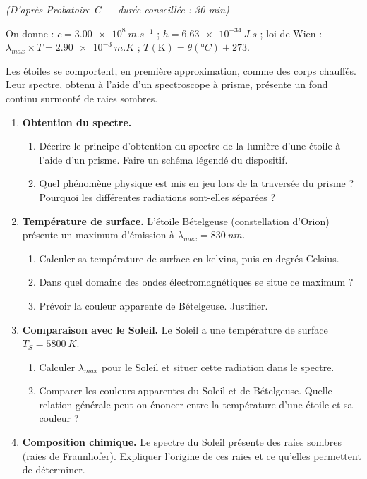 \documentclass[11pt]{article}
\begin{document}
\begin{exercice}
\textit{(D'après Probatoire C — durée conseillée : 30 min)}

On donne : $c = \SI{3,00e8}{m.s^{-1}}$ ; $h = \SI{6,63e-34}{J.s}$ ; loi de Wien : $\lambda_{max} \times T = \SI{2,90e-3}{m.K}$ ; $T(\text{K}) = \theta(°C) + 273$.

Les étoiles se comportent, en première approximation, comme des corps chauffés. Leur spectre, obtenu à l'aide d'un spectroscope à prisme, présente un fond continu surmonté de raies sombres.

\begin{enumerate}
\item \textbf{Obtention du spectre.}
\begin{enumerate}
\item Décrire le principe d'obtention du spectre de la lumière d'une étoile à l'aide d'un prisme. Faire un schéma légendé du dispositif.
\item Quel phénomène physique est mis en jeu lors de la traversée du prisme ? Pourquoi les différentes radiations sont-elles séparées ?
\end{enumerate}
\item \textbf{Température de surface.} L'étoile Bételgeuse (constellation d'Orion) présente un maximum d'émission à $\lambda_{max} = \SI{830}{nm}$.
\begin{enumerate}
\item Calculer sa température de surface en kelvins, puis en degrés Celsius.
\item Dans quel domaine des ondes électromagnétiques se situe ce maximum ?
\item Prévoir la couleur apparente de Bételgeuse. Justifier.
\end{enumerate}
\item \textbf{Comparaison avec le Soleil.} Le Soleil a une température de surface $T_S = \SI{5800}{K}$.
\begin{enumerate}
\item Calculer $\lambda_{max}$ pour le Soleil et situer cette radiation dans le spectre.
\item Comparer les couleurs apparentes du Soleil et de Bételgeuse. Quelle relation générale peut-on énoncer entre la température d'une étoile et sa couleur ?
\end{enumerate}
\item \textbf{Composition chimique.} Le spectre du Soleil présente des raies sombres (raies de Fraunhofer). Expliquer l'origine de ces raies et ce qu'elles permettent de déterminer.
\end{enumerate}
\end{exercice}
\end{document}
